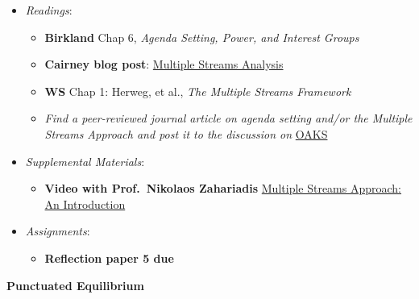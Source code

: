 \begin{itemize}

\item
  \emph{Readings}:

  \begin{itemize}
  
  \item
    \textbf{Birkland} Chap 6, \emph{Agenda Setting, Power, and Interest
    Groups}
  \item
    \textbf{Cairney blog post}:
    \href{https://paulcairney.wordpress.com/2013/10/31/policy-concepts-in-1000-words-multiple-streams-analysis/}{Multiple
    Streams Analysis}
  \item
    \textbf{WS} Chap 1: Herweg, et al., \emph{The Multiple Streams
    Framework}
  \item
    \faFileTextO \hspace{0.005in} \emph{Find a peer-reviewed journal
    article on agenda setting and/or the Multiple Streams Approach and
    post it to the discussion on} \href{https://lms.cofc.edu}{OAKS}
  \end{itemize}
\item
  \emph{Supplemental Materials}:

  \begin{itemize}
  
  \item
    \textbf{Video with Prof.~Nikolaos Zahariadis}
    \href{https://www.youtube.com/watch?v=JUlvyBVoJiI}{Multiple Streams
    Approach: An Introduction}
  \end{itemize}
\item
  \emph{Assignments}:

  \begin{itemize}
  
  \item
    \textbf{Reflection paper 5 due}
  \end{itemize}
\end{itemize}

\week \textbf{Punctuated Equilibrium}

